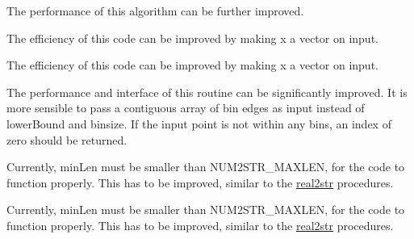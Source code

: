 \begin{DoxyRefList}
%
 The performance of this algorithm can be further improved. 
\item[Subprogram \mbox{\hyperlink{namespacestatistics__mod_a78eb375779f207363b4d13702a62dd75}{statistics\+\_\+mod\+::getbetacdf\+\_\+spr}} (alpha, beta, x)]\label{todo__todo000008}%
%
 The efficiency of this code can be improved by making {\ttfamily x} a vector on input. 
\item[Subprogram \mbox{\hyperlink{namespacestatistics__mod_a14ba13bfa061b8eb57d81963503a5d4a}{statistics\+\_\+mod\+::getbetacdf\+\_\+dpr}} (alpha, beta, x)]\label{todo__todo000009}%
%
 The efficiency of this code can be improved by making {\ttfamily x} a vector on input. 
\item[Subprogram \mbox{\hyperlink{namespacestatistics__mod_ad156e88b1d8c329706aaff7032a0c2c1}{statistics\+\_\+mod\+::getbin}} (x, lower\+Bound, nbin, binsize)]\label{todo__todo000010}%
%
 The performance and interface of this routine can be significantly improved. It is more sensible to pass a contiguous array of bin edges as input instead of {\ttfamily lower\+Bound} and {\ttfamily binsize}. If the input point is not within any bins, an index of zero should be returned. 
\item[Subprogram \mbox{\hyperlink{namespacestring__mod_aee6182818ef976fd03b132acff1ee6b0}{string\+\_\+mod\+::int322str}} (integer\+In, format\+In, min\+Len)]\label{todo__todo000011}%
%
 Currently, {\ttfamily min\+Len} must be smaller than {\ttfamily N\+U\+M2\+S\+T\+R\+\_\+\+M\+A\+X\+L\+EN}, for the code to function properly. This has to be improved, similar to the {\ttfamily \mbox{\hyperlink{interfacestring__mod_1_1real2str}{real2str}}} procedures. 
\item[Subprogram \mbox{\hyperlink{namespacestring__mod_a7da657dc69639627fc4f1e9487ef0592}{string\+\_\+mod\+::int642str}} (integer\+In, format\+In, min\+Len)]\label{todo__todo000012}%
%
 Currently, {\ttfamily min\+Len} must be smaller than {\ttfamily N\+U\+M2\+S\+T\+R\+\_\+\+M\+A\+X\+L\+EN}, for the code to function properly. This has to be improved, similar to the {\ttfamily \mbox{\hyperlink{interfacestring__mod_1_1real2str}{real2str}}} procedures. 
\item[Subprogram \mbox{\hyperlink{namespacesystem__mod_afd53f477deeaf2fcf3657b5ea400e153}{system\+\_\+mod\+::getsysteminfo}} (List, Err, OS, count, cache\+File)]\label{todo__todo000013}%

\end{DoxyRefList}
